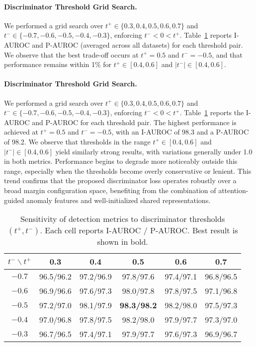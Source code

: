 \documentclass[a4paper,fleqnn]{cas-sc}
\begin{document}
\paragraph{Discriminator Threshold Grid Search.} 
We performed a grid search over $t^+ \in \{0.3,0.4,0.5,0.6,0.7\}$ and $t^- \in \{-0.7,-0.6,-0.5,-0.4,-0.3\}$, enforcing $t^- < 0 < t^+$. Table~\ref{tab:threshold_grid} reports I-AUROC and P-AUROC (averaged across all datasets) for each threshold pair. We observe that the best trade-off occurs at $t^+ = 0.5$ and $t^- = -0.5$, and that performance remains within 1\% for $t^+ \in [0.4,0.6]$ and $|t^-| \in [0.4,0.6]$.

\paragraph{Discriminator Threshold Grid Search.} 
We performed a grid search over $t^+ \in \{0.3, 0.4, 0.5, 0.6, 0.7\}$ and $t^- \in \{-0.7, -0.6, -0.5, -0.4, -0.3\}$, enforcing $t^- < 0 < t^+$. Table~\ref{tab:threshold_grid} reports the I-AUROC and P-AUROC for each threshold pair. The highest performance is achieved at $t^+ = 0.5$ and $t^- = -0.5$, with an I-AUROC of 98.3 and a P-AUROC of 98.2. We observe that thresholds in the range $t^+ \in [0.4, 0.6]$ and $|t^-| \in [0.4, 0.6]$ yield similarly strong results, with variations generally under 1.0 in both metrics. Performance begins to degrade more noticeably outside this range, especially when the thresholds become overly conservative or lenient. This trend confirms that the proposed discriminator loss operates robustly over a broad margin configuration space, benefiting from the combination of attention-guided anomaly features and well-initialized shared representations.

\renewcommand{\thetable}{11}

\begin{table}[ht]
  \centering
  \caption{Sensitivity of detection metrics to discriminator thresholds $(t^+, t^-)$. Each cell reports I-AUROC / P-AUROC. Best result is shown in bold.}
  \label{tab:threshold_grid}
  \begin{tabular}{c|ccccc}
    \toprule
    $t^- \backslash t^+$ & 0.3 & 0.4 & 0.5 & 0.6 & 0.7 \\
    \midrule
    $-0.7$ & 96.5/96.2 & 97.2/96.9 & 97.8/97.6 & 97.4/97.1 & 96.8/96.5 \\
    $-0.6$ & 96.9/96.6 & 97.6/97.3 & 98.0/97.8 & 97.8/97.5 & 97.1/96.8 \\
    $-0.5$ & 97.2/97.0 & 98.1/97.9 & \textbf{98.3/98.2} & 98.2/98.0 & 97.5/97.3 \\
    $-0.4$ & 97.0/96.8 & 97.8/97.5 & 98.2/98.0 & 97.9/97.7 & 97.3/97.0 \\
    $-0.3$ & 96.7/96.5 & 97.4/97.1 & 97.9/97.7 & 97.6/97.3 & 96.9/96.7 \\
    \bottomrule
  \end{tabular}
\end{table}
\end{document}
